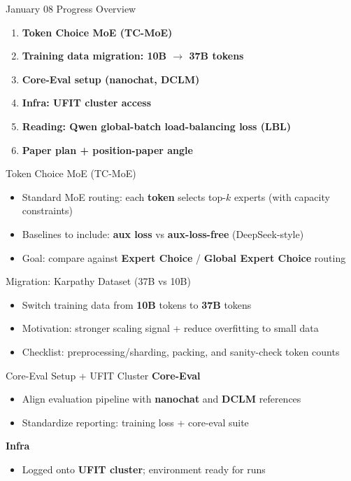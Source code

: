 \documentclass{beamer}
\begin{document}
\begin{frame}{January 08 Progress Overview}
\begin{enumerate}
    \item \textbf{Token Choice MoE (TC-MoE)}
    \item \textbf{Training data migration: 10B $\rightarrow$ 37B tokens}
    \item \textbf{Core-Eval setup (nanochat, DCLM)}
    \item \textbf{Infra: UFIT cluster access}
    \item \textbf{Reading: Qwen global-batch load-balancing loss (LBL)}
    \item \textbf{Paper plan + position-paper angle}
\end{enumerate}
\end{frame}

\begin{frame}{Token Choice MoE (TC-MoE)}
\begin{itemize}
    \item Standard MoE routing: each \textbf{token} selects top-$k$ experts (with capacity constraints)
    \item Baselines to include: \textbf{aux loss} vs \textbf{aux-loss-free} (DeepSeek-style)
    \item Goal: compare against \textbf{Expert Choice} / \textbf{Global Expert Choice} routing
\end{itemize}
\end{frame}

\begin{frame}{Migration: Karpathy Dataset (37B vs 10B)}
\begin{itemize}
    \item Switch training data from \textbf{10B} tokens to \textbf{37B} tokens
    \item Motivation: stronger scaling signal + reduce overfitting to small data
    \item Checklist: preprocessing/sharding, packing, and sanity-check token counts
\end{itemize}
\end{frame}

\begin{frame}{Core-Eval Setup + UFIT Cluster}
\textbf{Core-Eval}
\begin{itemize}
    \item Align evaluation pipeline with \textbf{nanochat} and \textbf{DCLM} references
    \item Standardize reporting: training loss + core-eval suite
\end{itemize}

\vspace{0.4cm}
\textbf{Infra}
\begin{itemize}
    \item Logged onto \textbf{UFIT cluster}; environment ready for runs
\end{itemize}
\end{frame}
\end{document}
